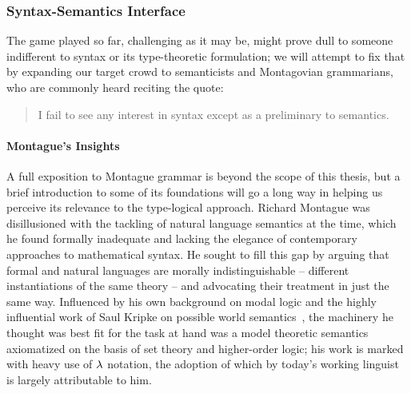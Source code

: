 \subsubsection{Syntax-Semantics Interface}\label{subsubsection:ssi_tlg}
The game played so far, challenging as it may be, might prove dull to someone indifferent to syntax or its type-theoretic formulation; we will attempt to fix that by expanding our target crowd to semanticists and Montagovian grammarians, who are
commonly heard reciting the quote:
\begin{quote}
I fail to see any interest in syntax except as a preliminary to semantics.~\cite{montague1970universal}
\end{quote}

\paragraph{Montague's Insights}
A full exposition to Montague grammar is beyond the scope of this thesis, but a brief introduction to some of its foundations will go a long way in helping us perceive its relevance to the type-logical approach.
Richard Montague was disillusioned with the tackling of natural language semantics at the time, which he found formally inadequate and lacking the elegance of contemporary approaches to mathematical syntax.
He sought to fill this gap by arguing that formal and natural languages are morally indistinguishable -- different instantiations of the same theory -- and advocating their treatment in just the same way.
Influenced by his own background on modal logic and the highly influential work of Saul Kripke on possible world semantics~\cite{kripke1963semantical}, the machinery he thought was best fit for the task at hand was a model theoretic semantics axiomatized on the basis of set theory and higher-order logic; his work is marked with heavy use of $\mathnormal{\lambda}$ notation, the adoption of which by today's working linguist is largely attributable to him.

